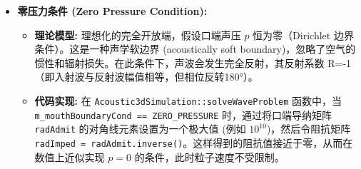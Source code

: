 \documentclass{ctexart}
\begin{document}
\begin{itemize}
\begin{itemize}
        \item \textbf{零压力条件 (Zero Pressure Condition):}
            \begin{itemize}
                \item \textbf{理论模型:} 理想化的完全开放端，假设口端声压 $p$ 恒为零（Dirichlet 边界条件）。这是一种声学软边界 (acoustically soft boundary)，忽略了空气的惯性和辐射损失。在此条件下，声波会发生完全反射，其反射系数 R=-1（即入射波与反射波幅值相等，但相位反转180°）。
                \item \textbf{代码实现:} 在 \texttt{Acoustic3dSimulation::solveWaveProblem} 函数中，当 \texttt{m\_mouthBoundaryCond == ZERO\_PRESSURE} 时，通过将口端导纳矩阵 \texttt{radAdmit} 的对角线元素设置为一个极大值 (例如 $10^{10}$)，然后令阻抗矩阵 \texttt{radImped = radAdmit.inverse()}。这样得到的阻抗值接近于零，从而在数值上近似实现 $p=0$ 的条件，此时粒子速度不受限制。
            \end{itemize}


\end{itemize}
\end{itemize}
\end{document}
